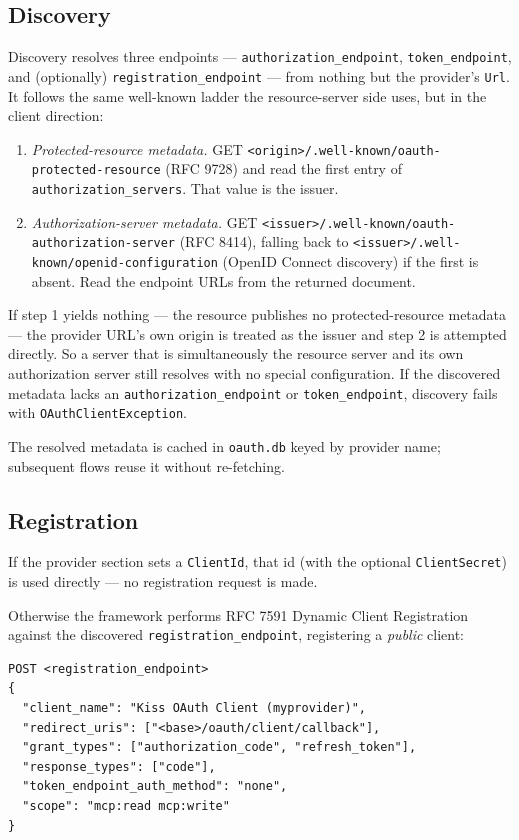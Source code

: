 \subsection{Discovery}

Discovery resolves three endpoints --- \texttt{authorization\_endpoint}, \texttt{token\_endpoint}, and (optionally) \texttt{registration\_endpoint} --- from nothing but the provider's \texttt{Url}.  It follows the same well-known ladder the resource-server side uses, but in the client direction:

\begin{enumerate}
  \item \emph{Protected-resource metadata.}  GET \texttt{<origin>/.well-known/oauth-protected-resource} (RFC 9728) and read the first entry of \texttt{authorization\_servers}.  That value is the issuer.
  \item \emph{Authorization-server metadata.}  GET \texttt{<issuer>/.well-known/oauth-authorization-server} (RFC 8414), falling back to \texttt{<issuer>/.well-known/openid-configuration} (OpenID Connect discovery) if the first is absent.  Read the endpoint URLs from the returned document.
\end{enumerate}

If step 1 yields nothing --- the resource publishes no protected-resource metadata --- the provider URL's own origin is treated as the issuer and step 2 is attempted directly.  So a server that is simultaneously the resource server and its own authorization server still resolves with no special configuration.  If the discovered metadata lacks an \texttt{authorization\_endpoint} or \texttt{token\_endpoint}, discovery fails with \texttt{OAuthClientException}.

The resolved metadata is cached in \texttt{oauth.db} keyed by provider name; subsequent flows reuse it without re-fetching.

\subsection{Registration}

If the provider section sets a \texttt{ClientId}, that id (with the optional \texttt{ClientSecret}) is used directly --- no registration request is made.

Otherwise the framework performs RFC 7591 Dynamic Client Registration against the discovered \texttt{registration\_endpoint}, registering a \emph{public} client:

\begin{lstlisting}[style=java]
POST <registration_endpoint>
{
  "client_name": "Kiss OAuth Client (myprovider)",
  "redirect_uris": ["<base>/oauth/client/callback"],
  "grant_types": ["authorization_code", "refresh_token"],
  "response_types": ["code"],
  "token_endpoint_auth_method": "none",
  "scope": "mcp:read mcp:write"
}
\end{lstlisting}

